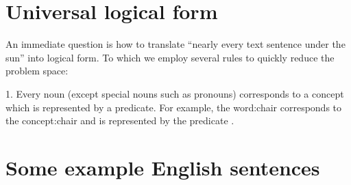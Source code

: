 \section{Universal logical form}
\label{sec:UniversalLogicalForm}

An immediate question is how to translate ``nearly every text sentence under the sun'' into logical form.  To which we employ several rules to quickly reduce the problem space:

1.  Every noun (except special nouns such as pronouns) corresponds to a concept which is represented by a predicate.  For example, the word:chair corresponds to the concept:chair and is represented by the predicate .



\section{Some example English sentences}
\label{sec:English-examples}

